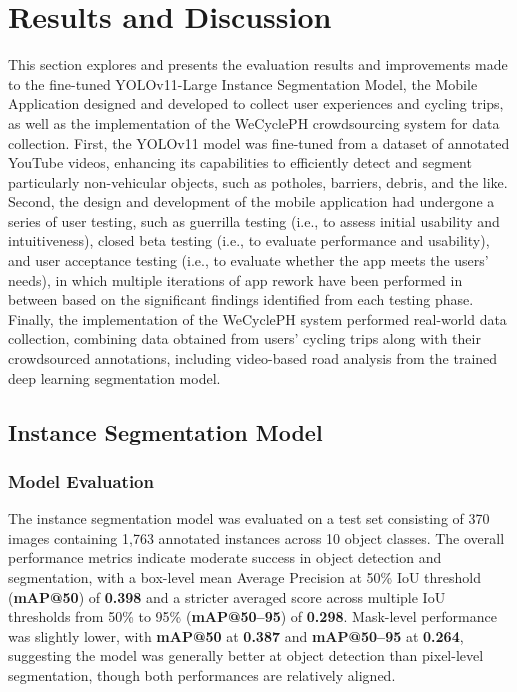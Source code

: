 %
%
%                 

\chapter{Results and Discussion}

This section explores and presents the evaluation results and improvements made to the fine-tuned YOLOv11-Large Instance Segmentation Model, the Mobile Application designed and developed to collect user experiences and cycling trips, as well as the implementation of the WeCyclePH crowdsourcing system for data collection. First, the YOLOv11 model was fine-tuned from a dataset of annotated YouTube videos, enhancing its capabilities to efficiently detect and segment particularly non-vehicular objects, such as potholes, barriers, debris, and the like. Second, the design and development of the mobile application had undergone a series of user testing, such as guerrilla testing (i.e., to assess initial usability and intuitiveness), closed beta testing (i.e., to evaluate performance and usability), and user acceptance testing (i.e., to evaluate whether the app meets the users' needs), in which multiple iterations of app rework have been performed in between based on the significant findings identified from each testing phase. Finally, the implementation of the WeCyclePH system performed real-world data collection, combining data obtained from users' cycling trips along with their crowdsourced annotations, including video-based road analysis from the trained deep learning segmentation model.

\section{Instance Segmentation Model}
\subsection{Model Evaluation}
The instance segmentation model was evaluated on a test set consisting of 370 images containing 1,763 annotated instances across 10 object classes. The overall performance metrics indicate moderate success in object detection and segmentation, with a box-level mean Average Precision at 50\% IoU threshold (\textbf{mAP@50}) of \textbf{0.398} and a stricter averaged score across multiple IoU thresholds from 50\% to 95\% (\textbf{mAP@50–95}) of \textbf{0.298}. Mask-level performance was slightly lower, with \textbf{mAP@50} at \textbf{0.387} and \textbf{mAP@50–95} at \textbf{0.264}, suggesting the model was generally better at object detection than pixel-level segmentation, though both performances are relatively aligned.

